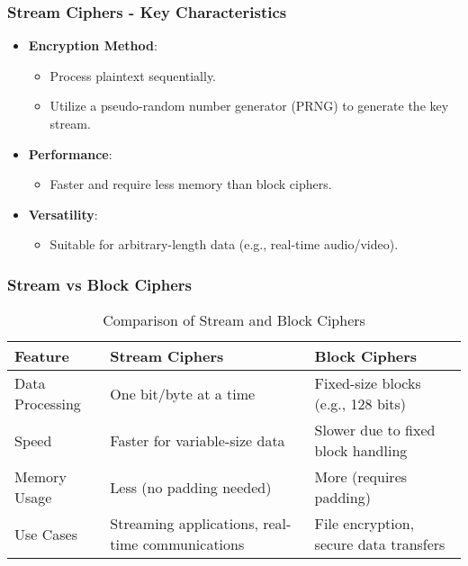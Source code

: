 \documentclass{beamer}
\begin{document}
\begin{frame}[fragile]
    \frametitle{Stream Ciphers - Key Characteristics}
    \begin{itemize}
        \item \textbf{Encryption Method}:
        \begin{itemize}
            \item Process plaintext sequentially.
            \item Utilize a pseudo-random number generator (PRNG) to generate the key stream.
        \end{itemize}
        
        \item \textbf{Performance}:
        \begin{itemize}
            \item Faster and require less memory than block ciphers.
        \end{itemize}
        
        \item \textbf{Versatility}:
        \begin{itemize}
            \item Suitable for arbitrary-length data (e.g., real-time audio/video).
        \end{itemize}
    \end{itemize}
\end{frame}

\begin{frame}[fragile]
    \frametitle{Stream vs Block Ciphers}
    \begin{table}[ht]
        \centering
        \begin{tabular}{|l|l|l|}
            \hline
            \textbf{Feature} & \textbf{Stream Ciphers} & \textbf{Block Ciphers} \\ 
            \hline
            Data Processing & One bit/byte at a time & Fixed-size blocks (e.g., 128 bits) \\ 
            \hline
            Speed & Faster for variable-size data & Slower due to fixed block handling \\ 
            \hline
            Memory Usage & Less (no padding needed) & More (requires padding) \\ 
            \hline
            Use Cases & Streaming applications, real-time communications & File encryption, secure data transfers \\ 
            \hline
        \end{tabular}
        \caption{Comparison of Stream and Block Ciphers}
    \end{table}
\end{frame}
\end{document}
